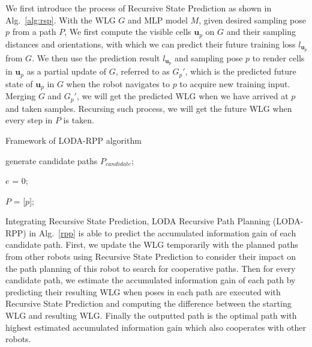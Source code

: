 We first introduce the process of Recursive State Prediction as shown in Alg.~\ref{alg:rsp}.
With the WLG $G$ and MLP model $M$, given desired sampling pose $p$ from a path $P$,
We first compute the visible cells $\bm{u}_p$ on $G$ and their sampling distances and orientations, with which we can predict their future training loss $l_{\bm{u}_p}$ from $G$.
We then use the prediction result $l_{\bm{u}_p}$ and sampling pose $p$ to render cells in $\bm{u}_p$ as a partial update of $G$, referred to as $G_p'$, which is the predicted future state of $\bm{u}_p$ in $G$ when the robot navigates to $p$ to acquire new training input.
Merging $G$ and $G_p'$, we will get the predicted WLG when we have arrived at $p$ and taken samples.
Recursing such process, we will get the future WLG when every step in $P$ is taken.

\vspace{-0.3cm}
\begin{algorithm}[h]
  \caption{Framework of LODA-RPP algorithm}
  \label{rpp}
  \BlankLine

  generate candidate paths $P_{candidate}$;

  $e$ = 0;

  $P$ = [$p$];

\end{algorithm}
\vspace{-0.3cm}

Integrating Recursive State Prediction, LODA Recursive Path Planning (LODA-RPP) in Alg.~\ref{rpp} is able to predict the accumulated information gain of each candidate path.
First, we update the WLG temporarily with the planned paths from other robots using Recursive State Prediction to consider their impact on the path planning of this robot to search for cooperative paths.
Then for every candidate path, we estimate the accumulated information gain of each path by predicting their resulting WLG when poses in each path are executed with Recursive State Prediction and computing the difference between the starting WLG and resulting WLG.
Finally the outputted path is the optimal path with highest estimated accumulated information gain which also cooperates with other robots.
